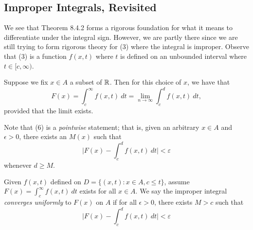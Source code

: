 \subsection{Improper Integrals, Revisited}

We see that Theorem 8.4.2 forms a rigorous foundation for what it means to differentiate under the integral sign. However, we are partly there since we are still trying to form rigorous theory for (3) where the integral is improper. Observe that (3) is a function \( f(x,t)  \) where \( t  \) is defined on an unbounded interval where \( t \in [c, \infty ) \). 

Suppose we fix \( x \in A  \) a subset of \( \mathbb{R}  \). Then for this choice of \( x  \), we have that 
\[  F(x) = \int_{ c }^{ \infty  }  f(x,t) \ dt = \lim_{ n \to \infty  } \int_{ c }^{ d } f(x,t) \ dt, \tag{6} \]
provided that the limit exists.

Note that (6) is a \textit{pointwise} statement; that is, given an arbitrary \( x \in A  \) and \( \epsilon > 0  \), there exists an \( M(x)  \) such that 
\[  \Big| F(x) - \int_{ c }^{ d }  f(x,t) \  dt  \Big| < \varepsilon \]
whenever \( d \geq M \). 
\begin{definition}
   Given \( f(x,t)  \) defined on \( D = \{ (x,t) : x \in A , c \leq t  \}  \), assume \( F(x) = \int_{ c }^{ \infty  }  f(x,t) \ dt  \) exists for all \( x \in A  \). We say the improper integral \textit{converges uniformly} to \( F(x)  \) on \( A  \) if for all \( \epsilon > 0  \), there exists \( M > c  \) such that 
   \[  \Big| F(x) - \int_{ c }^{ d }  f(x,t) \ dt \Big| < \varepsilon \]
\end{definition}

